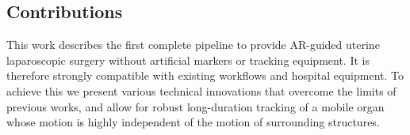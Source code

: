 
\subsection{Contributions}
\label{sec:contributions}
This work describes the first complete pipeline to provide AR-guided uterine laparoscopic surgery without artificial markers or tracking equipment. It is therefore strongly compatible with existing workflows and hospital equipment. To achieve this we present various technical innovations that overcome the limits of previous works, and allow for robust long-duration tracking of a mobile organ whose motion is highly independent of the motion of surrounding structures.

